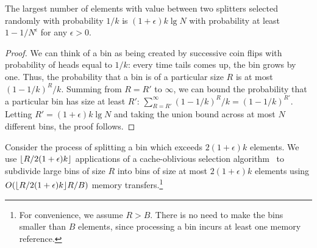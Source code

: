 \begin{lemma}
  The largest number of elements with value between two splitters selected randomly 
  with probability $1/k$ is $(1+\epsilon)k\lg N$ with probability at least 
  $1 - 1/N^\epsilon$ for any $\epsilon > 0$.
  \label{lem:max_R}
\end{lemma}
\begin{proof}
  We can think of a bin as being created by successive coin flips with probability
  of heads equal to $1/k$: every time tails comes up, the bin grows by one.  Thus,
  the probability that a bin is of a particular size $R$ is at most $(1-1/k)^R / k$.
  Summing from $R=R'$ to $\infty$, we can bound the probability that a particular
  bin has size at least $R'$: $\sum_{R=R'}^{\infty}(1-1/k)^R/k = (1-1/k)^{R'}$.
  Letting $R'=(1+\epsilon)k\lg N$ and taking the union bound across at most $N$
  different bins, the proof follows.
\end{proof}

Consider the process of splitting a bin which exceeds $2(1+\epsilon)k$ elements.  We use 
$\mathopen{}\left\lfloor R/2(1+\epsilon)k \right\rfloor\mathclose{}$ applications of a cache-oblivious selection 
algorithm~\cite{FrigoLePr99} to subdivide large bins of size $R$ into bins of 
size at most $2(1+\epsilon)k$ elements using $O(\mathopen{}\left\lfloor R/2(1+\epsilon)k \right\rfloor\mathclose{} R/B)$ 
memory transfers.\footnote{For
convenience, we assume $R>B$.  There is no need to make the bins smaller than $B$
elements, since processing a bin incurs at least one memory reference.}


